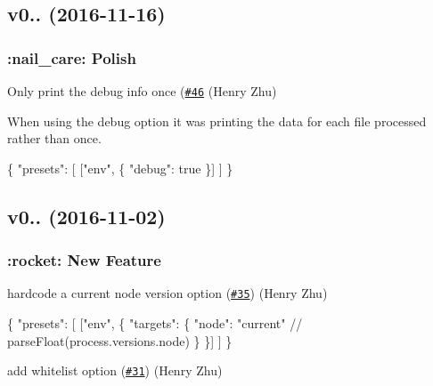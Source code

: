 \subsection*{v0.. (2016-\/11-\/16)}

\subsubsection*{\+:nail\+\_\+care\+: Polish}


\begin{DoxyItemize}
\item Only print the debug info once (\href{https://github.com/babel/babel-preset-env/pull/46}{\tt \#46} (Henry Zhu)
\end{DoxyItemize}

When using the {\ttfamily debug} option it was printing the data for each file processed rather than once.


\begin{DoxyCode}
\{
  "presets": [
    ["env", \{
      "debug": true
    \}]
  ]
\}
\end{DoxyCode}


\subsection*{v0.. (2016-\/11-\/02)}

\subsubsection*{\+:rocket\+: New Feature}


\begin{DoxyItemize}
\item hardcode a current node version option (\href{https://github.com/babel/babel-preset-env/pull/35}{\tt \#35}) (Henry Zhu)
\end{DoxyItemize}


\begin{DoxyCode}
\{
  "presets": [
    ["env", \{
      "targets": \{
        "node": "current" // parseFloat(process.versions.node)
      \}
    \}]
  ]
\}
\end{DoxyCode}



\begin{DoxyItemize}
\item add \textquotesingle{}whitelist\textquotesingle{} option (\href{https://github.com/babel/babel-preset-env/pull/31}{\tt \#31}) (Henry Zhu)
\end{DoxyItemize}


